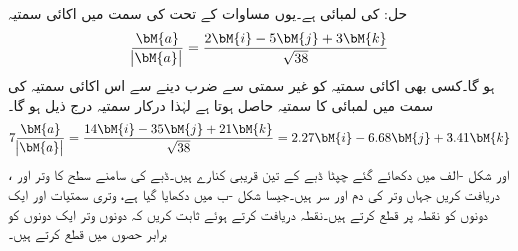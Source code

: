 حل: کی لمبائی  ہے۔یوں مساوات  کے تحت  کی سمت میں اکائی سمتیہ
\begin{align*}
\frac{\bM{a}}{\abs{\bM{a}}}=\frac{2\bM{i}-5\bM{j}+3\bM{k}}{\sqrt{38}}
\end{align*}
ہو گا۔کسی بھی اکائی سمتیہ کو غیر سمتی  سے ضرب دینے سے اس اکائی سمتیہ کی سمت میں  لمبائی کا سمتیہ حاصل ہوتا ہے لہٰذا درکار سمتیہ درج ذیل ہو گا۔
\begin{align*}
7\frac{\bM{a}}{\abs{\bM{a}}}=\frac{14\bM{i}-35\bM{j}+21\bM{k}}{\sqrt{38}}=2.27\bM{i}-6.68\bM{j}+3.41\bM{k}
\end{align*}
،  اور  شکل  -الف میں دکھائے گئے چپٹا  ڈبے کے تین قریبی کنارے ہیں۔ڈبے کی سامنے سطح  کا وتر  اور  دریافت کریں جہاں وتر  کی دم   اور سر  ہیں۔جیسا شکل  -ب میں دکھایا گیا ہے، وتری سمتیات  اور  ایک دونوں کو نقطہ  پر قطع کرتے ہیں۔نقطہ  دریافت کرتے ہوئے ثابت کریں کہ دونوں وتر ایک دونوں کو برابر حصوں میں قطع کرتے ہیں۔
